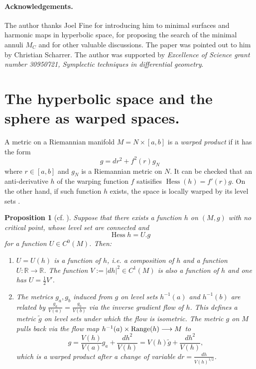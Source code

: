\documentclass[11pt]{article}
\newtheorem{proposition}[theorem]{Proposition}
\DeclareMathOperator{\hess}{Hess}
\begin{document}
\paragraph{Acknowledgements.}
The author thanks Joel Fine for introducing him to minimal surfaces and
harmonic maps in hyperbolic space, for proposing the search of the minimal annuli \(M_C\) and
for other valuable discussions. The paper
\cite{Hoffman.Spruck74_SobolevIsoperimetricInequalities} was pointed out to him by Christian Scharrer. The author was supported by 
\emph{Excellence of Science grant number 30950721, Symplectic techniques in differential geometry}.

\section{The hyperbolic space and the sphere as warped spaces.}
\label{sec:orga423e7a}
A metric on a Riemannian manifold \(M=N\times [a,b]\) is a \emph{warped product} if it has the
 form 
\begin{equation}
\label{eq:warped-metric}
 g = dr^2 + f^2(r) g_N 
\end{equation}
where \(r\in [a,b]\) and \(g_N\) is a Riemannian metric on \(N\). It can be checked that an anti-derivative \(h\) of the warping function \(f\) satisifies  \(\hess(h) =
f'(r) g\). On the other hand, if such function \(h\) exists, the space is locally
warped by its level sets \cite{Cheeger.Colding96_LowerBoundsRicci}.

\begin{proposition}[cf. \cite{Cheeger.Colding96_LowerBoundsRicci}]
\label{prop:cheeger-colding}
Suppose that there exists a function \(h\) on \((M,g)\) with no critical point,
whose level set are connected and 
\begin{equation}
\label{eq:xi}
\hess h = U.g
\end{equation}
for a function \(U\in C^0(M)\). Then:
\begin{enumerate}
\item \(U=U(h)\) is a function of \(h\), i.e. a composition of \(h\) and a function \(U:
   \mathbb{R}\longrightarrow \mathbb{R}\). The function \(V:= |dh|^2\in C^1(M)\) is
also a function of \(h\) and one has \(U = \frac{1}{2}V'\).
\item The metrics \(g_a, g_b\) induced from \(g\) on level sets \(h^{-1}(a)\) and \(h^{-1}(b)\) are related
by \(\frac{g_a}{V(a)}= \frac{g_b}{V(b)}\) via the inverse gradient flow of \(h\). 
This defines a metric \(\tilde g\) on level sets under which the flow is isometric. 
The metric \(g\) on \(M\) pulls back
via the flow map \(h^{-1}(a)\times {\rm Range}(h) \longrightarrow M\) to
\[
    g = \frac{V(h)}{V(a)}g_a + \frac{dh^2}{V(h)} = V(h)\tilde g + \frac{dh^2}{V(h)},
   \]
which is a warped product after a change of variable \(dr = \frac{dh}{V(h)^{1/2}}\).
\end{enumerate}
\end{proposition}
\end{document}
